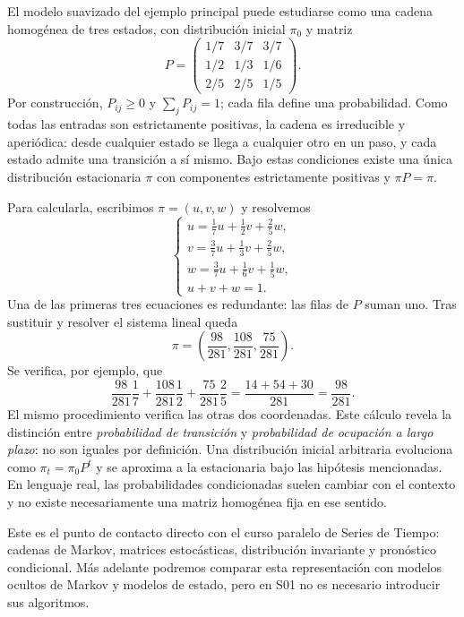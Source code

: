 El modelo suavizado del ejemplo principal puede estudiarse como una cadena
homogénea de tres estados, con distribución inicial $\pi_0$ y matriz
\[
P=\begin{pmatrix}1/7&3/7&3/7\\1/2&1/3&1/6\\2/5&2/5&1/5\end{pmatrix}.
\]
Por construcción, $P_{ij}\ge0$ y $\sum_jP_{ij}=1$; cada fila define
una probabilidad. Como todas las entradas son estrictamente positivas,
la cadena es irreducible y aperiódica: desde cualquier estado se llega
a cualquier otro en un paso, y cada estado admite una transición a sí mismo.
Bajo estas condiciones existe una única distribución estacionaria $\pi$
con componentes estrictamente positivas y $\pi P=\pi$.

Para calcularla, escribimos $\pi=(u,v,w)$ y resolvemos
\[
\begin{cases}
 u=\tfrac17u+\tfrac12v+\tfrac25w,\\
 v=\tfrac37u+\tfrac13v+\tfrac25w,\\
 w=\tfrac37u+\tfrac16v+\tfrac15w,\\
 u+v+w=1.
\end{cases}
\]
Una de las primeras tres ecuaciones es redundante: las filas de $P$
suman uno. Tras sustituir y resolver el sistema lineal queda
\[
\boxed{\pi=\left(\frac{98}{281},\frac{108}{281},\frac{75}{281}\right).}
\]
Se verifica, por ejemplo, que
\[
\frac{98}{281}\frac17+\frac{108}{281}\frac12
+\frac{75}{281}\frac25
=\frac{14+54+30}{281}=\frac{98}{281}.
\]
El mismo procedimiento verifica las otras dos coordenadas.
Este cálculo revela la distinción entre \emph{probabilidad de transición}
y \emph{probabilidad de ocupación a largo plazo}: no son iguales por
definición. Una distribución inicial arbitraria evoluciona como
$\pi_t=\pi_0P^t$ y se aproxima a la estacionaria bajo las hipótesis
mencionadas. En lenguaje real, las probabilidades condicionadas suelen
cambiar con el contexto y no existe necesariamente una matriz homogénea
fija en ese sentido.

\begin{puente}
Este es el punto de contacto directo con el curso paralelo de Series
de Tiempo: cadenas de Markov, matrices estocásticas, distribución invariante
y pronóstico condicional. Más adelante podremos comparar esta representación
con modelos ocultos de Markov y modelos de estado, pero en S01 no es
necesario introducir sus algoritmos.
\end{puente}

